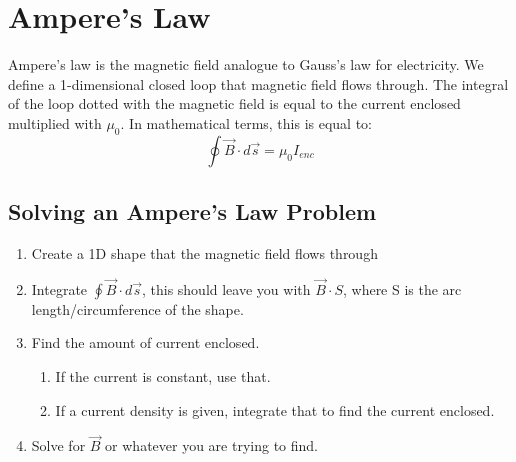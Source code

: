 \documentclass{article}
\begin{document}
\section{Ampere's Law}
Ampere's law is the magnetic field analogue to Gauss's law for electricity.  We define a 1-dimensional closed loop that magnetic field flows through.  The integral of the loop dotted with the magnetic field is equal to the current enclosed multiplied with $\mu_0$.  In mathematical terms, this is equal to:
\[\oint \vec{B} \cdot d\vec{s} = \mu_0 I_{enc} \]
\subsection{Solving an Ampere's Law Problem}
\begin{enumerate}
\item Create a 1D shape that the magnetic field flows through
\item Integrate $\oint \vec{B} \cdot d\vec{s}$, this should leave you with $\vec{B} \cdot S$, where S is the arc length/circumference of the shape.
\item Find the amount of current enclosed.
  \begin{enumerate}
  \item If the current is constant, use that.
  \item If a current density is given, integrate that to find the current enclosed.
  \end{enumerate}
\item Solve for $\vec{B}$ or whatever you are trying to find.
\end{enumerate}
\end{document}
